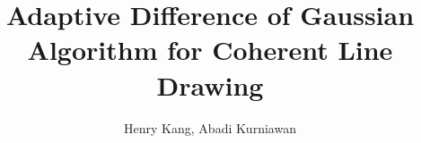 \begin{frontmatter}
\title{Adaptive Difference of Gaussian Algorithm for Coherent Line Drawing}

\author{Henry Kang, Abadi Kurniawan}








\begin{abstract}

\end{abstract}



%
\end{frontmatter}
